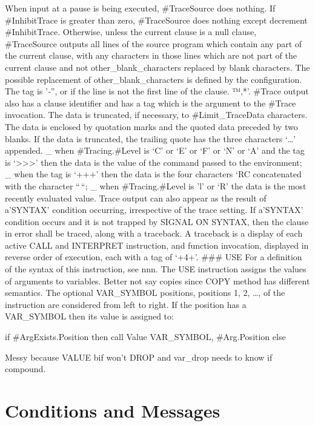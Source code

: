 When input at a pause is being executed, \#TraceSource does nothing. If
\#InhibitTrace is greater than zero, \#TraceSource does nothing except
decrement \#InhibitTrace. Otherwise, unless the current clause is a null
clause, \#TraceSource outputs all lines of the source program which
contain any part of the current clause, with any characters in those
lines which are not part of the current clause and not
other\_blank\_characters replaced by blank characters. The possible
replacement of other\_blank\_characters is defined by the configuration.
The tag is '\emph{-}'', or if the line is not the first line of the
clause. ™,*'. \#Trace output also has a clause identifier and has a tag
which is the argument to the \#Trace invocation. The data is truncated,
if necessary, to \#Limit\_TraceData characters. The data is enclosed by
quotation marks and the quoted data preceded by two blanks. If the data
is truncated, the trailing quote has the three characters `\ldots{}'
appended. \_ when \#Tracing.\#Level is `C' or `E' or `F' or `N' or `A'
and the tag is `\textgreater\textgreater\textgreater{}' then the data is
the value of the command passed to the environment; \_ when the tag is
`+++' then the data is the four characters `RC concatenated with the
character ``\,``; \_ when \#Tracing.\#Level is 'l' or `R' the data is
the most recently evaluated value. Trace output can also appear as the
result of a'SYNTAX' condition occurring, irrespective of the trace
setting. If a'SYNTAX' condition occurs and it is not trapped by SIGNAL
ON SYNTAX, then the clause in error shall be traced, along with a
traceback. A traceback is a display of each active CALL and INTERPRET
instruction, and function invocation, displayed in reverse order of
execution, each with a tag of `+4+'. \#\#\# USE For a definition of the
syntax of this instruction, see nnn. The USE instruction assigns the
values of arguments to variables. Better not say copies since COPY
method has different semantics. The optional VAR\_SYMBOL positions,
positions 1, 2, \ldots, of the instruction are considered from left to
right. If the position has a VAR\_SYMBOL then its value is assigned to:

if \#ArgExists.Position then call Value VAR\_SYMBOL, \#Arg.Position else

Messy because VALUE bif won't DROP and var\_drop needs to know if
compound.

\hypertarget{conditions-and-messages}{%
\section{Conditions and Messages}\label{conditions-and-messages}}

